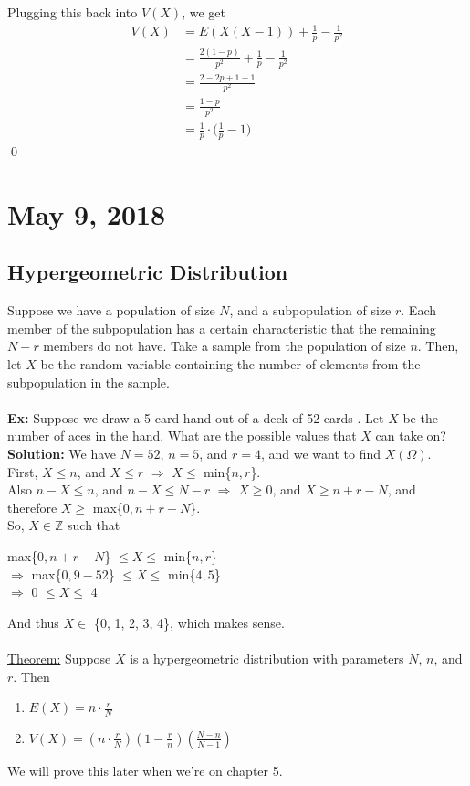 \documentclass{article}
\newcommand{\Z}{\mathbb{Z}}
\newcommand{\Om}{\Omega}
\newcommand{\imply}{\Rightarrow}
\newcommand{\x}{\cdot}
\begin{document}
Plugging this back into $V(X)$, we get
\begin{align*}
	V(X) &= E(X(X-1)) + \frac{1}{p} - \frac{1}{p^2}\\
		&= \frac{2(1-p)}{p^2} + \frac{1}{p} - \frac{1}{p^2}\\
		&= \frac{2 -2p +1 -1}{p^2}\\
		&= \frac{1-p}{p^2}\\
		&=\frac{1}{p}\x \Big(\frac{1}{p} -1\Big)
\end{align*}
\qed
\newpage


\section{May 9, 2018}
\subsection{Hypergeometric Distribution}
Suppose we have a population of size $N$, and a subpopulation of size $r$. Each member of the subpopulation has a certain characteristic that the remaining $N - r$ members do not have. Take a sample from the population of size $n$. Then, let $X$ be the random variable containing the number of elements from the subpopulation in the sample.\\\\
\textbf{Ex:} Suppose we draw a 5-card hand out of a deck of 52 cards . Let $X$ be the number of aces in the hand. What are the possible values that $X$ can take on?\\
\textbf{Solution:} We have $N=52$, $n=5$, and $r=4$, and we want to find $X(\Om)$.\\
First, $X \leq n$, and $X \leq r$ $\imply$ $X\leq$ min\{$n, r$\}.\\
Also $n - X \leq n$, and $n-X \leq N-r$ $\imply$ $X \geq 0$, and $X \geq n+r-N$, and therefore $X \geq$ max\{$0, n+r-N$\}.\\
So, $X \in \Z$ such that
\begin{center}
max\{$0, n+r-N$\} $\leq X \leq$ min\{$n, r$\}\\
$\imply$ max\{$0, 9-52$\} $\leq X \leq$ min\{$4, 5$\}\\
$\imply$ 0 $\leq X \leq$ 4
\end{center}
And thus $X \in$ \{0, 1, 2, 3, 4\}, which makes sense.\\\\
\underline{Theorem:} Suppose $X$ is a hypergeometric distribution with parameters $N$, $n$, and $r$. Then
\begin{enumerate}
	\item $E(X) = n\x \frac{r}{N}$
	\item $V(X) = (n\x \frac{r}{N})(1 - \frac{r}{n})(\frac{N-n}{N-1})$
\end{enumerate}
We will prove this later when we're on chapter 5.
\end{document}

